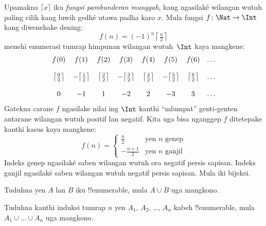 \documentclass[../../../include/open-logic-section]{subfiles}
\begin{document}
\begin{ex}
Upamakna $\lceil x \rceil$ iku \emph{fungsi pambunderan munggah},
kang ngasilaké wilangan wutuh paling cilik kang luwih gedhé utawa padha karo $x$.
Mula fungsi $f \colon \Nat \to \Int$ kang diwenehake dening:
\[
  f(n) = (-1)^{n} \left\lceil\tfrac{n}{2}\right\rceil
\]
menehi enumerasi tumrap himpunan wilangan
wutuh~$\Int$ kaya mangkene:
\[
\begin{array}{c c c c c c c c}
f(0) & f(1) & f(2) & f(3) & f(4) & f(5) & f(6) & \dots \\ \\
\big\lceil \tfrac{0}{2} \big\rceil & -\big\lceil \tfrac{1}{2}\big\rceil &  \big\lceil \tfrac{2}{2} \big\rceil & -\big\lceil \tfrac{3}{2} \big\rceil & \big\lceil \tfrac{4}{2} \big\rceil  & -\big\lceil \tfrac{5}{2}\big\rceil & \big\lceil \tfrac{6}{2} \big\rceil & \dots \\ \\
0 & -1 & 1 & -2 & 2 & -3 & 3& \dots
\end{array}
\]
Gatekna carane $f$ ngasilake nilai ing $\Int$ kanthi ``mlumpat''
genti-genten antarane wilangan wutuh positif lan negatif.
Kita uga bisa nganggep $f$ ditetepake kanthi kasus kaya mangkene:
\[
f(n) = \begin{cases}
  \frac{n}{2} & \text{yen $n$ genep}\\
  -\frac{n+1}{2} & \text{yen $n$ ganjil}
  \end{cases}
\]
Indeks genep ngasilaké saben wilangan wutuh ora negatif persis sapisan.
Indeks ganjil ngasilaké saben wilangan wutuh negatif persis sapisan.
Mula iki bijeksi.
\end{ex}

\begin{prob}
Tuduhna yen $A$ lan $B$ iku !!{enumerable}, mula $A \cup B$ uga mangkono.
\end{prob}

\begin{prob}
Tuduhna kanthi induksi tumrap $n$ yen $A_1$, $A_2$, \dots, $A_n$ kabeh
!!{enumerable}, mula $A_1 \cup \dots \cup A_n$ uga mangkono.
\end{prob}
\end{document}
